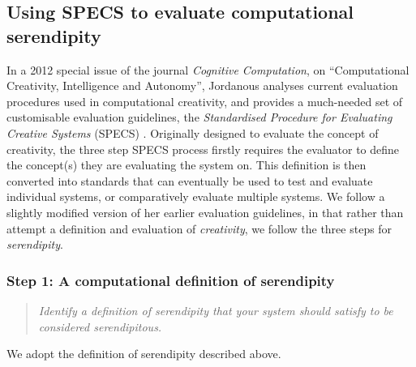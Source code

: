 \subsection{Using SPECS to evaluate computational serendipity}\label{specs-overview}

In a 2012 special issue of the journal {\em Cognitive Computation}, on
``Computational Creativity, Intelligence and Autonomy'', Jordanous
analyses current evaluation procedures used in computational
creativity, and provides a much-needed set of customisable evaluation
guidelines, the \emph{Standardised Procedure for Evaluating Creative
  Systems} (SPECS) \cite{jordanous:12}. Originally designed to evaluate the concept of creativity, the three step SPECS process firstly requires the evaluator to define the concept(s) they are evaluating the system on. This definition is then converted into standards that can eventually be used to test and evaluate individual systems, or comparatively evaluate multiple systems.
%
We follow a slightly modified version of her earlier evaluation
guidelines, in that rather than attempt a definition and evaluation of
{\em creativity}, we follow the three steps for \emph{serendipity}.

\subsubsection*{Step 1: A computational definition of serendipity}
\begin{quote} {\em Identify a definition of serendipity that your
    system should satisfy to be considered serendipitous.}\end{quote}

\noindent We adopt the definition of serendipity described above.

